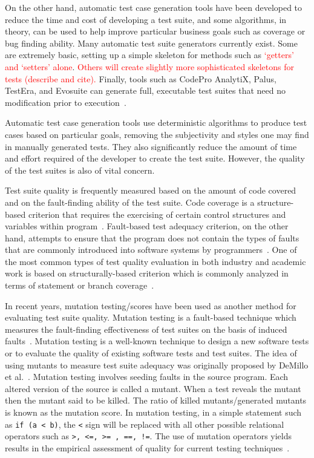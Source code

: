 On the other hand, automatic test case generation tools have been developed to reduce the time and cost of developing a test suite, and some algorithms, in theory, can be used to help improve particular business goals such as coverage or bug finding ability.  Many automatic test suite generators currently exist.  Some are extremely basic, setting up a simple skeleton for methods such as \textcolor{red}{`getters' and `setters' alone}\cite{}.  \textcolor{red}{Others will create slightly more sophisticated skeletons for tests (describe and cite).}  Finally, tools such as CodePro AnalytiX, Palus, TestEra, and Evosuite can generate full, executable test suites that need no modification prior to execution~\cite{Fraser:2011:EAT:2025113.2025179, Zhang:2011:PHA:1985793.1986036, Marinov:2001:TNF:872023.872551, codepro}.  

Automatic test case generation tools use deterministic algorithms to produce test cases based on particular goals, removing the subjectivity and styles one may find in manually generated tests.  They also significantly reduce the amount of time and effort required of the developer to create the test suite.  However, the quality of the test suites is also of vital concern.  

Test suite quality is frequently measured based on the amount of code covered and on the fault-finding ability of the test suite.  Code coverage is a structure-based criterion that requires the exercising of certain control structures and variables within program~\cite{kapfhammer-testing-handbook}. Fault-based test adequacy criterion, on the other hand, attempts to ensure that the program does not contain the types of faults that are commonly introduced into software systems by programmers~\cite{demillo1978hints, zhu1997software}.  One of the most common types of test quality evaluation in both industry and academic work is based on structurally-based criterion which is commonly analyzed in terms of statement or branch coverage~\cite{weyuker1988evaluation}.

In recent years, mutation testing/scores have been used as another method for evaluating test suite quality. Mutation testing is a fault-based technique which measures the fault-finding effectiveness of test suites on the basis of induced faults~\cite{demillo1978hints, hamlet1977testing}. Mutation testing is a well-known technique to design a new software tests or to evaluate the quality of existing software tests and test suites. The idea of using mutants to measure test suite adequacy was originally proposed by DeMillo et al.~\cite{demillo1978hints}. Mutation testing involves seeding faults in the source program. Each altered version of the source is called a mutant. When a test reveals the mutant then the mutant said to be killed. The ratio of killed mutants/generated mutants is known as the mutation score. In mutation testing, in a simple statement such as  \texttt{if (a < b)}, the \texttt{<} sign will be replaced with all other possible relational operators such as \texttt{>, <=, >= , ==, !=}. The use of mutation operators yields results in the empirical assessment of quality for current testing techniques~\cite{andrews2005mutation}.  

